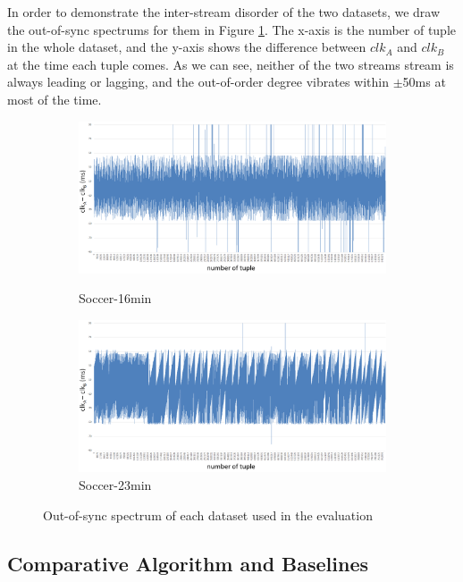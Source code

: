 \documentclass[a4paper, 11pt, twoside]{report}
\begin{document}
In order to demonstrate the inter-stream disorder of the two datasets, we draw the out-of-sync spectrums for them in Figure \ref{fig:out-of-sync-spectrum}. The x-axis is the number of tuple in the whole dataset, and the y-axis shows the difference between $clk_A$ and $clk_B$ at the time each tuple comes. As we can see, neither of the two streams stream is always leading or lagging, and the out-of-order degree vibrates within $\pm$50ms at most of the time.\\

\begin{figure}[h]
	\centering
	\begin{subfigure}[t]{5in}
		\centering
		\includegraphics[width=5in]{spectrum-16min}
		\caption{Soccer-16min}
		\hspace{5pt}
		\includegraphics[width=5in]{spectrum-23min}
		\caption{Soccer-23min}	
	\end{subfigure}
	\caption{Out-of-sync spectrum of each dataset used in the evaluation}\label{fig:out-of-sync-spectrum}
\end{figure}

\subsection{Comparative Algorithm and Baselines}
\end{document}
